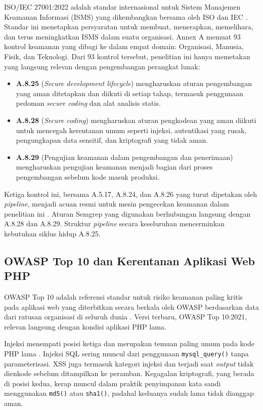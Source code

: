     ISO/IEC 27001:2022 adalah standar internasional untuk Sistem Manajemen Keamanan Informasi (ISMS) yang dikembangkan bersama oleh ISO dan IEC \cite{iso27001_2022}. Standar ini menetapkan persyaratan untuk membuat, menerapkan, memelihara, dan terus meningkatkan ISMS dalam suatu organisasi. Annex A memuat 93 kontrol keamanan yang dibagi ke dalam empat domain: Organisasi, Manusia, Fisik, dan Teknologi. Dari 93 kontrol tersebut, penelitian ini hanya memetakan yang langsung relevan dengan pengembangan perangkat lunak:

    \begin{itemize}
        \item \textbf{A.8.25} (\textit{Secure development lifecycle}) mengharuskan aturan pengembangan yang aman ditetapkan dan diikuti di setiap tahap, termasuk penggunaan pedoman \textit{secure coding} dan alat analisis statis.
        \item \textbf{A.8.28} (\textit{Secure coding}) mengharuskan aturan pengkodean yang aman diikuti untuk mencegah kerentanan umum seperti injeksi, autentikasi yang rusak, pengungkapan data sensitif, dan kriptografi yang tidak aman.
        \item \textbf{A.8.29} (Pengujian keamanan dalam pengembangan dan penerimaan) mengharuskan pengujian keamanan menjadi bagian dari proses pengembangan sebelum kode masuk produksi.
    \end{itemize}

    Ketiga kontrol ini, bersama A.5.17, A.8.24, dan A.8.26 yang turut dipetakan oleh \textit{pipeline}, menjadi acuan resmi untuk mesin pengecekan keamanan dalam penelitian ini \cite{iso27001_2022}. Aturan Semgrep yang digunakan berhubungan langsung dengan A.8.28 dan A.8.29. Struktur \textit{pipeline} secara keseluruhan mencerminkan kebutuhan siklus hidup A.8.25.

    \subsection{OWASP Top 10 dan Kerentanan Aplikasi Web PHP}

    OWASP Top 10 adalah referensi standar untuk risiko keamanan paling kritis pada aplikasi web yang diterbitkan secara berkala oleh OWASP berdasarkan data dari ratusan organisasi di seluruh dunia \cite{owasp2021}. Versi terbaru, OWASP Top 10:2021, relevan langsung dengan kondisi aplikasi PHP lama.

    Injeksi menempati posisi ketiga dan merupakan temuan paling umum pada kode PHP lama \cite{owasp2021}. Injeksi SQL sering muncul dari penggunaan \texttt{mysql\_query()} tanpa parameterisasi. XSS juga termasuk kategori injeksi dan terjadi saat \textit{output} tidak dienkode sebelum ditampilkan ke peramban. Kegagalan kriptografi, yang berada di posisi kedua, kerap muncul dalam praktik penyimpanan kata sandi menggunakan \texttt{md5()} atau \texttt{sha1()}, padahal keduanya sudah lama tidak dianggap aman.

